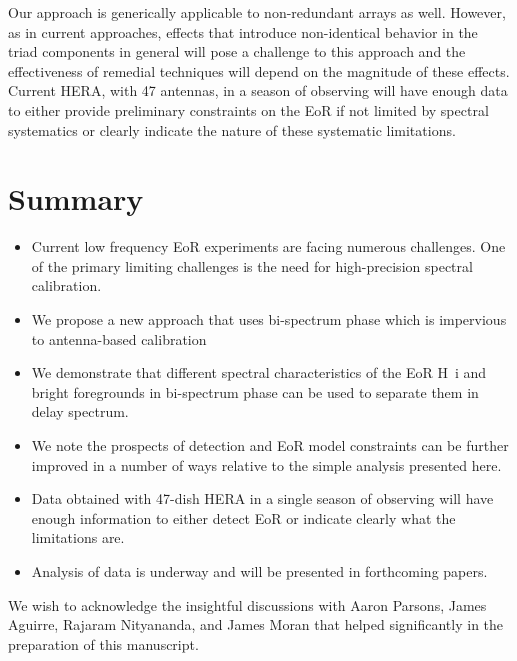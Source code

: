 \documentclass[
reprint,
superscriptaddress,
amsmath,
amssymb,
aps,
]{revtex4-1}
\begin{document}
Our approach is generically applicable to non-redundant arrays as well. However, as in current approaches, effects that introduce non-identical behavior in the triad components in general will pose a challenge to this approach and the effectiveness of remedial techniques will depend on the magnitude of these effects. Current HERA, with 47 antennas, in a season of observing will have enough data to either provide preliminary constraints on the EoR if not limited by spectral systematics or clearly indicate the nature of these systematic limitations.

\section{Summary}\label{sec:summary}

\begin{itemize}
\item Current low frequency EoR experiments are facing numerous challenges. One of the primary limiting challenges is the need for high-precision spectral calibration.
\item We propose a new approach that uses bi-spectrum phase which is impervious to antenna-based calibration
\item We demonstrate that different spectral characteristics of the EoR H~{\sc i} and bright foregrounds in bi-spectrum phase can be used to separate them in delay spectrum.
\item We note the prospects of detection and EoR model constraints can be further improved in a number of ways relative to the simple analysis presented here.
\item Data obtained with 47-dish HERA in a single season of observing will have enough information to either detect EoR or indicate clearly what the limitations are.
\item Analysis of data is underway and will be presented in forthcoming papers.
\end{itemize}

\begin{acknowledgments}
We wish to acknowledge the insightful discussions with Aaron Parsons, James Aguirre, Rajaram Nityananda, and James Moran that helped significantly in the preparation of this manuscript.
\end{acknowledgments}

\end{document}
